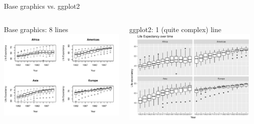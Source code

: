 \documentclass[aspectratio=169]{beamer}\usepackage[]{graphicx}\usepackage[]{color}
\makeatletter
\def\maxwidth{ %
  \ifdim\Gin@nat@width>\linewidth
    \linewidth
  \else
    \Gin@nat@width
  \fi
}
\newenvironment{knitrout}{}{} %
\makeatother
\begin{document}
\begin{frame}[fragile]{Base graphics vs. ggplot2}
\begin{columns}
  \begin{column}{0.50\textwidth}
  Base graphics: 8 lines
\begin{knitrout}\scriptsize
{}\color{fgcolor}
\includegraphics[width=\maxwidth]{figure/unnamed-chunk-1-1} 

\end{knitrout}
  \end{column}
  \begin{column}{0.5\textwidth}
  ggplot2: 1 (quite complex) line
\begin{knitrout}\scriptsize
{}\color{fgcolor}
\includegraphics[width=\maxwidth]{figure/unnamed-chunk-2-1} 

\end{knitrout}
  \end{column}
\end{columns}
\end{frame}
\end{document}
